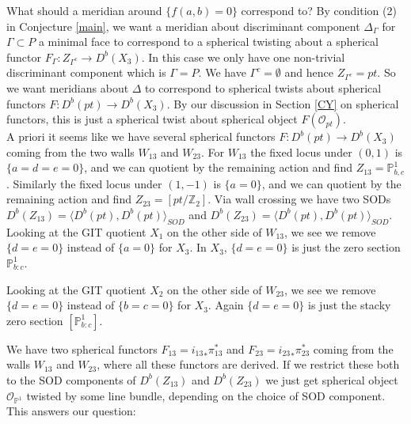 \documentclass[oneside,reqno]{amsart}
\theoremstyle{definition}
\theoremstyle{definition}
\theoremstyle{definition}
\theoremstyle{definition}
\newcommand{\PP}{\mathbb{P}}
\newcommand{\Z}{\mathbb{Z}}
\newcommand{\Os}{\mathcal{O}}
\begin{document}
\newline
What should a meridian around $\{ f(a,b)=0\}$ correspond to? By condition (2) in Conjecture \ref{main}, we want a meridian about discriminant component $\Delta_{\Gamma}$ for $\Gamma \subset P$ a minimal face to correspond to a spherical twisting about a spherical functor $F_{\Gamma}: Z_{\Gamma^c} \to D^b(X_3)$. In this case we only have one non-trivial discriminant component which is $\Gamma = P$. We have $\Gamma^c = \emptyset$ and hence $Z_{\Gamma^c} = pt$. So we want meridians about $\Delta$ to correspond to spherical twists about spherical functors $F: D^b(pt) \to D^b(X_3)$. By our discussion in Section \ref{CY} on spherical functors, this is just a spherical twist about spherical object $F(\Os_{pt})$.\\
\newline 
A priori it seems like we have several spherical functors $F: D^b(pt) \to D^b(X_3)$ coming from the two walls $W_{13}$ and $W_{23}$. For $W_{13}$ the fixed locus under $(0,1)$ is $\{ a=d=e=0 \}$, and we can quotient by the remaining action and find $Z_{13} = \PP^1_{b,c}$. Similarly the fixed locus under $(1,-1)$ is $\{ a=0\}$, and we can quotient by the remaining action and find $Z_{23} = \left[ pt / \Z_2\right]$. Via wall crossing we have two SODs $D^b(Z_{13}) = \langle D^b(pt), D^b(pt) \rangle_{SOD}$ and $D^b(Z_{23}) = \langle D^b(pt), D^b(pt) \rangle_{SOD}$. Looking at the GIT quotient $X_1$ on the other side of $W_{13}$, we see we  remove $\{ d=e=0\}$ instead of $\{ a=0\}$ for $X_3$. In $X_3$, $\{ d=e=0\}$ is just the zero section $\PP^1_{b:c}$.
\begin{center}
\end{center}
Looking at the GIT quotient $X_2$ on the other side of $W_{23}$, we see we  remove $\{ d=e=0\}$ instead of $\{ b=c=0\}$ for $X_3$. Again $\{ d=e=0\}$ is just the stacky zero section $\left[\PP^1_{b:c} \right]$.
\begin{center}
\end{center}
We have two spherical functors $F_{13} = {i_{13}}_* \pi_{13}^*$ and $F_{23} = {i_{23}}_* \pi_{23}^*$ coming from the walls $W_{13}$ and $W_{23}$, where all these functors are derived. If we restrict these both to the SOD components of $D^b(Z_{13})$ and $D^b(Z_{23})$ we just get spherical object $\Os_{\PP^1}$ twisted by some line bundle, depending on the choice of SOD component. This answers our question:
\end{document}
